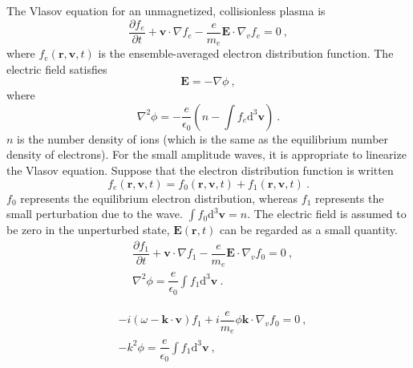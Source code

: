 \documentclass[12pt,a4paper]{article}
\renewcommand{\vec}[1]{\boldsymbol{#1}}
\newcommand{\dif}{\mathrm{d}}
\begin{document}
The Vlasov equation for an unmagnetized, collisionless plasma is
\begin{equation*}
\dfrac{\partial f_e}{\partial t} + \vec{v}\cdot \nabla f_e - \dfrac{e}{m_e} \vec{E} \cdot \nabla_v f_e = 0 ~,
\end{equation*}
where $f_e(\vec{r}, \vec{v}, t)$ is the ensemble-averaged electron distribution function. The electric field satisfies
\begin{equation}
\vec{E} = -\nabla \phi ~,
\end{equation}
where
\begin{equation}
\nabla^2 \phi = -\dfrac{e}{\epsilon_0} \left(n -\int f_e \dif^3 \vec{v} \right) ~.
\end{equation}
$n$ is the number density of ions (which is the same as the equilibrium number density of electrons). For the small amplitude waves, it is appropriate to linearize the Vlasov equation. Suppose that the electron distribution function is written
\begin{equation}
f_e(\vec{r}, \vec{v}, t) = f_0(\vec{r}, \vec{v}, t) +f_1(\vec{r}, \vec{v}, t) ~.
\end{equation}
$f_0$ represents the equilibrium electron distribution, whereas $f_1$ represents the small perturbation due to the wave. $\int f_0 \dif^3 \vec{v} = n$. The electric field is assumed to be zero in the unperturbed state, $\vec{E}(\vec{r}, t)$ can be regarded as a small quantity.
\begin{align}
& \dfrac{\partial f_1}{\partial t} + \vec{v}\cdot \nabla f_1 - \dfrac{e}{m_e} \vec{E} \cdot \nabla_v f_0 = 0 ~, \\
& \nabla^2 \phi = \dfrac{e}{\epsilon_0} \int f_1 \dif^3 \vec{v} ~.
\end{align}

\begin{align}
& -i(\omega -\vec{k}\cdot \vec{v}) f_1 + i\dfrac{e}{m_e} \phi \vec{k}\cdot \nabla_v f_0 = 0 ~, \\
& -k^2 \phi = \dfrac{e}{\epsilon_0} \int f_1 \dif^3 \vec{v} ~,
\end{align}
\end{document}
